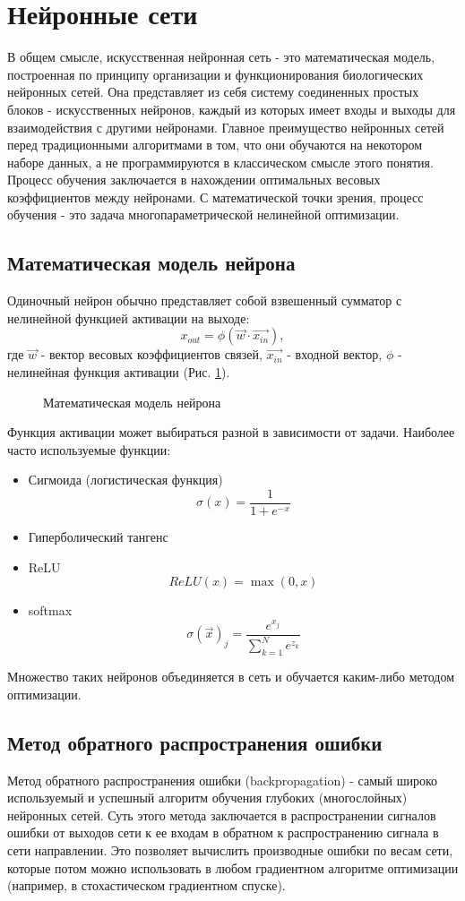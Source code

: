 \clearpage
\section{Нейронные сети}
	В общем смысле, искусственная нейронная сеть - это математическая модель, построенная по принципу организации и функционирования биологических нейронных сетей. Она представляет из себя систему соединенных простых блоков - искусственных нейронов, каждый из которых имеет входы и выходы для взаимодействия с другими нейронами. Главное преимущество нейронных сетей перед традиционными алгоритмами в том, что они обучаются на некотором наборе данных, а не программируются в классическом смысле этого понятия. Процесс обучения заключается в нахождении оптимальных весовых коэффициентов между нейронами. С математической точки зрения, процесс обучения - это задача многопараметрической нелинейной оптимизации.
	\subsection{Математическая модель нейрона}
		Одиночный нейрон обычно представляет собой взвешенный сумматор с нелинейной функцией активации на выходе:
		$$x_{out} = \phi(\vec{w} \cdotp \vec{x_{in}}),$$
		где $\vec{w}$ - вектор весовых коэффициентов связей, $\vec{x_{in}}$ - входной вектор, $\phi$ - нелинейная функция активации (Рис. \ref{3-artificial-neuron-model}).
		
		\begin{figure}[h]
			\caption{Математическая модель нейрона}
			\label{3-artificial-neuron-model}
		\end{figure}
		
		Функция активации может выбираться разной в зависимости от задачи. Наиболее часто используемые функции:
		
		\begin{itemize}
			\item Сигмоида (логистическая функция)
					$$\sigma(x) = \frac{1}{1 + e^{-x}}$$
			\item Гиперболический тангенс
			\item ReLU
					$$ReLU(x) = \max(0, x)$$
			\item softmax
					$$\sigma(\vec{x})_j = \frac{e^{x_j}}{\sum_{k=1}^{N} e^{z_k}}$$
		\end{itemize}
		Множество таких нейронов объединяется в сеть и обучается каким-либо методом оптимизации.
	\subsection{Метод обратного распространения ошибки}
		Метод обратного распространения ошибки (backpropagation) - самый широко используемый и успешный алгоритм обучения глубоких (многослойных) нейронных сетей. Суть этого метода заключается в распространении сигналов ошибки от выходов сети к ее входам в обратном к распространению сигнала в сети направлении. Это позволяет вычислить производные ошибки по весам сети, которые потом можно использовать в любом градиентном алгоритме оптимизации (например, в стохастическом градиентном спуске).
		
